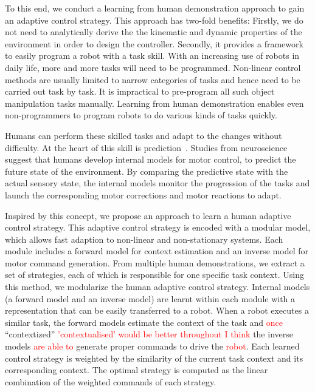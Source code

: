 To this end, we conduct a learning from human demonstration approach to gain an adaptive control strategy. This approach has two-fold benefits: Firstly, we do not need to analytically derive the the kinematic and dynamic properties of the environment in order to design the controller. Secondly, it provides a framework to easily program a robot with a task skill. With an increasing use of robots in daily life, more and more tasks will need to be programmed. Non-linear control methods are usually limited to narrow categories of tasks and hence need to be carried out task by task. It is impractical to pre-program all such object manipulation tasks manually. Learning from human demonstration enables even non-programmers to program robots to do various kinds of tasks quickly.

Humans can perform these skilled tasks and adapt to the changes without difficulty. At the heart of this skill is prediction~\cite{flanagan2006control}. Studies from neuroscience suggest that humans develop internal models for motor control, to predict the future state of the environment. By comparing the predictive state with the actual sensory state, the internal models monitor the progression of the tasks and launch the corresponding motor corrections and motor reactions to adapt.


Inspired by this concept, we propose an approach to learn a human adaptive control strategy. This adaptive control strategy is encoded with a modular model, which allows fast adaption to non-linear and non-stationary systems. Each module includes a forward model for context estimation and an inverse model for motor command generation. From multiple human demonstrations, we extract a set of strategies, each of which is responsible for one specific task context. Using this method, we modularize the human adaptive control strategy. Internal models (a forward model and an inverse model) are learnt within each module with a representation that can be easily transferred to a robot. When a robot executes a similar task, the forward models estimate the context of the task and \textcolor{red}{once} ``contextized'' \textcolor{red}{'contextualised' would be better throughout I think} the inverse models \textcolor{red}{are able to} generate proper commands to drive the \textcolor{red}{robot}.
Each learned control strategy is weighted by the similarity of the current task context and its corresponding context. The optimal strategy is computed as the linear combination of the weighted commands of each strategy.

